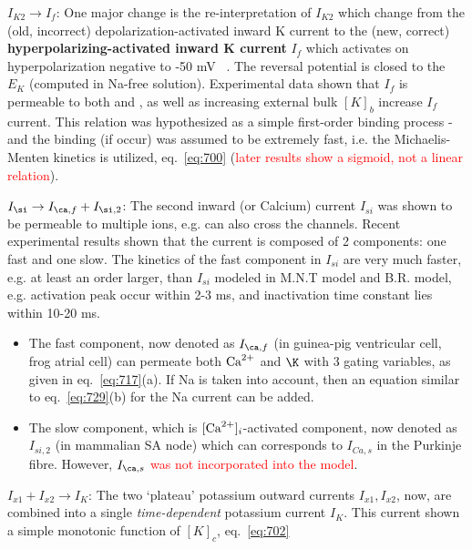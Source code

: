 {\bf $I_{K2} \rightarrow I_f$}: One major change is the re-interpretation of
$I_{K2}$ which change from the (old, incorrect) depolarization-activated inward
K current to the (new, correct) {\bf hyperpolarizing-activated inward K current}
$I_f$ which activates on hyperpolarization negative to -50 mV
~\citep{difrancesco1981nip}. The reversal potential is closed to the $E_K$
(computed in Na-free solution). Experimental data shown that $I_f$ is permeable
to both  and , as well as increasing external bulk $[K]_b$
increase $I_f$ current. This relation was hypothesized as a simple first-order
binding process - and the binding (if occur) was assumed to be extremely fast,
i.e. the Michaelis-Menten kinetics is utilized, eq.~\eqref{eq:700}
(\textcolor{red}{later results show a sigmoid, not a linear
  relation}).

{\bf $I_\si \rightarrow I_{\ca,f} + I_{\si,2}$}: 
The second inward (or Calcium) current $I_{si}$ was shown to be
permeable to multiple ions, e.g.  can also cross the
channels. Recent experimental results shown that the current is
composed of 2 components: one fast and one slow. The kinetics of the
fast component in $I_{si}$ are very much faster, e.g. at least an
order larger, than $I_{si}$ modeled in M.N.T model and B.R. model,
e.g. activation peak occur within 2-3 ms, and inactivation time
constant lies within 10-20 ms. 
\begin{itemize}
\item The fast component, now denoted as $I_{\ca,f}$ (in guinea-pig
  ventricular cell, frog atrial cell) can permeate both ${\text{Ca}^{2+}}$ and $\K$
  with 3 gating variables, as given in eq.~\eqref{eq:717}(a).  If Na
  is taken into account, then an equation similar to
  eq.~\eqref{eq:729}(b) for the Na current can be added.


\item The slow component, which is $[{\text{Ca}^{2+}}]_i$-activated component,
  now denoted as $I_{si,2}$ (in mammalian SA node) which can
  corresponds to $I_{Ca,s}$ in the Purkinje fibre. However,
  \textcolor{red}{$I_{\ca,s}$ was not incorporated into the model}.

\end{itemize}

{\bf $I_{x1} + I_{x2} \rightarrow I_{K}$}: The two `plateau'
potassium outward currents $I_{x1},I_{x2}$, now, are combined into a single
{\it time-dependent} potassium current $I_{K}$. This current
shown a simple monotonic function of $[K]_c$, eq.~\eqref{eq:702}

